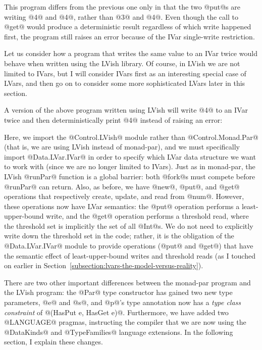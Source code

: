 This program differs from the previous one only in that the two @put@s
are writing @4@ and @4@, rather than @3@ and @4@.  Even though the
call to @get@ would produce a deterministic result regardless of which
write happened first, the program still raises an error because of the
IVar single-write restriction.

Let us consider how a program that writes the same value to an IVar
twice would behave when written using the LVish library.  Of course,
in LVish we are not limited to IVars, but I will consider IVars first
as an interesting special case of LVars, and then go on to consider
some more sophisticated LVars later in this section.

A version of the above program written using LVish will write @4@ to
an IVar twice and then deterministically print @4@ instead of raising
an error:

\singlespacing

\doublespacing

Here, we import the @Control.LVish@ module rather than
@Control.Monad.Par@ (that is, we are using LVish instead of
monad-par), and we must specifically import @Data.LVar.IVar@ in order
to specify which LVar data structure we want to work with (since we
are no longer limited to IVars).  Just as in monad-par, the LVish
@runPar@ function is a global barrier: both @fork@s must compete
before @runPar@ can return.  Also, as before, we have @new@, @put@,
and @get@ operations that respectively create, update, and read from
@num@.  However, these operations now have LVar semantics: the @put@
operation performs a least-upper-bound write, and the @get@ operation
performs a threshold read, where the threshold set is implicitly the
set of all @Int@s.  We do not need to explicitly write down the
threshold set in the code; rather, it is the obligation of the
@Data.LVar.IVar@ module to provide operations (@put@ and @get@) that
have the semantic effect of least-upper-bound writes and threshold
reads (as I touched on earlier in
Section~\ref{subsection:lvars-the-model-versus-reality}).

There are two other important differences between the monad-par
program and the LVish program: the @Par@ type constructor has gained
two new type parameters, @e@ and @s@, and @p@'s type annotation now
has a \emph{type class constraint} of @(HasPut e, HasGet e)@.
Furthermore, we have added two @LANGUAGE@ pragmas, instructing the
compiler that we are now using the @DataKinds@ and @TypeFamilies@
language extensions.  In the following section, I explain these
changes.

